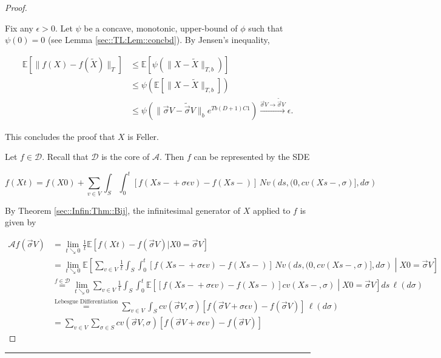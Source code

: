 \documentclass[12pt]{article}
\newcommand{\mb}{\mathbb}
\newcommand{\mc}{\mathcal}
\newcommand{\ra}{\rightarrow}
\newcommand{\os}{\overset}
\newcommand{\te}{\text}
\newcommand{\ep}{\epsilon}
\newcommand{\ind}{\hspace{24pt}}
\newcommand{\lin}{\rule{\linewidth}{0.4 pt}}
\newcommand{\ex}[1]{\mb{E}\left[#1\right]}			%
\renewcommand{\v}{v}							%
\renewcommand{\S}{S}							%
\newcommand{\s}{\sigma}							%
\newcommand{\sv}{\vec{\s}}						%
\renewcommand{\b}{b}							%
\newcommand{\ev}{\ep}							%
\newcommand{\T}{T}								%
\renewcommand{\t}{t}							%
\renewcommand{\tt}{s}							%
\newcommand{\X}{X}								%
\newcommand{\IG}{\mc{A}}						%
\newcommand{\IGr}{c}							%
\newcommand{\const}{C}							%
\newcommand{\degr}{D}							%
\newcommand{\core}{\mc{D}}						%
\newcommand{\poiss}{N}							%
\newcommand{\Sm}{\ell}							%
\newcommand{\alt}[1]{\widetilde{#1}}			%
\begin{document}
\begin{proof}
\begin{enumerate}[(a)]
\ind Fix any \(\ep > 0\). Let \(\psi\) be a concave, monotonic, upper-bound of \(\phi\) such that \(\psi(0) = 0\) (see Lemma \ref{sec::TL:Lem::concbd}). By Jensen's inequality,

\begin{align*}
\ex{\|f(\X{}{}) - f(\alt{\X}{{}{}})\|_\T} &\leq \ex{\psi\left(\|\X{}{} - \alt{\X}{{}{}}\|_{\T,\b{}}\right)}\\
&\leq \psi\left(\ex{\|\X{}{} - \alt{\X}{{}{}}\|_{\T,\b{}}}\right)\\
&\leq \psi\left(\|\sv{}{ V} - \alt{\sv}{}{V}\|_{\b{}}e^{\T\b{}(\degr+1)\const{1}}\right) \os{\sv{}{ V} \ra\alt{\sv}{}{V}}{\ra} \ep.
\end{align*}

This concludes the proof that \(\X{}{}\) is Feller.
\end{enumerate}

Let \(f \in \core\). Recall that \(\core\) is the core of \(\IG\). Then \(f\) can be represented by the SDE

\[f(\X{}{\t}) = f(\X{}{0}) + \sum_{\v \in  V} \int_\S\int_0^\t [f(\X{}{\tt-} + \s\ev{\v}) - f(\X{}{\tt-})]\,\poiss{\v}\left(d\tt,(0,\IGr{\v}(\X{}{\tt-},\s)],d\s\right)\]


By Theorem \ref{sec::Infin:Thm::Bij}, the infinitesimal generator of \(\X{}{}\) applied to \(f\) is given by 

\begin{align*}
\IG f(\sv{}{ V}) &= \lim_{\t \searrow 0} \frac{1}{\t} \ex{f(\X{}{\t}) - f(\sv{}{ V})|\X{}{0} = \sv{}{ V}}\\
&= \lim_{\t \searrow 0} \ex{\sum_{\v \in  V} \frac{1}{\t}\int_\S\int_0^\t \left[f(\X{}{\tt-} + \s\ev{\v}) - f(\X{}{\tt-})\right]\,\poiss{\v}\left(d\tt,(0,\IGr{\v}(\X{}{\tt-},\s)],d\s\right)\middle|\X{}{0} = \sv{}{ V}}\\
&\os{f \in \mc{D}}{=} \lim_{\t \searrow 0}\sum_{\v \in  V} \frac{1}{\t}\int_\S\int_0^\t \ex{\left[f(\X{}{\tt-} + \s\ev{\v}) - f(\X{}{\tt-})\right]\IGr{\v}(\X{}{\tt-},\s)\middle|\X{}{0} = \sv{}{ V}}d\tt\,\Sm(d\s)\\
&\os{\te{Lebesgue Differentiation}}{=} \sum_{\v \in  V} \int_\S \IGr{\v}(\sv{}{ V},\s)[f(\sv{}{ V} + \s\ev{\v}) - f(\sv{}{ V})]\,\Sm(d\s)\\
&= \sum_{\v \in  V} \sum_{\s \in \S} \IGr{\v}(\sv{}{ V},\s)[f(\sv{}{ V} + \s\ev{\v}) - f(\sv{}{ V})]
\end{align*}
\end{proof}

\lin
\end{document}
